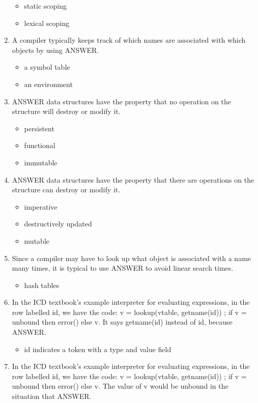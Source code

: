\documentclass{exam}
\begin{document}
\begin{enumerate}
\begin{itemize}
\item static scoping
\item lexical scoping
\end{itemize}
\item A compiler typically keeps track of which names are associated with which objects by using ANSWER.
\begin{itemize}
\item a symbol table
\item an environment
\end{itemize}
\item ANSWER data structures have the property that no operation on the structure will destroy or modify it.
\begin{itemize}
\item persistent
\item functional
\item immutable
\end{itemize}
\item ANSWER data structures have the property that there are operations on the structure can destroy or modify it.
\begin{itemize}
\item imperative
\item destructively updated
\item mutable
\end{itemize}
\item Since a compiler may have to look up what object is associated with a name many times, it is typical to use ANSWER to avoid linear search times.
\begin{itemize}
\item hash tables
\end{itemize}
\item In the ICD textbook's example interpreter for evaluating expressions, in the row labelled id, we have the code: v = lookup(vtable, getname(id)) ; if v = unbound then error() else v.  It says getname(id) instead of id, because ANSWER.
\begin{itemize}
\item id indicates a token with a type and value field
\end{itemize}
\item In the ICD textbook's example interpreter for evaluating expressions, in the row labelled id, we have the code: v = lookup(vtable, getname(id)) ; if v = unbound then error() else v.  The value of v would be unbound in the situation that ANSWER.
\begin{itemize}

\end{itemize}
\end{enumerate}
\end{document}
